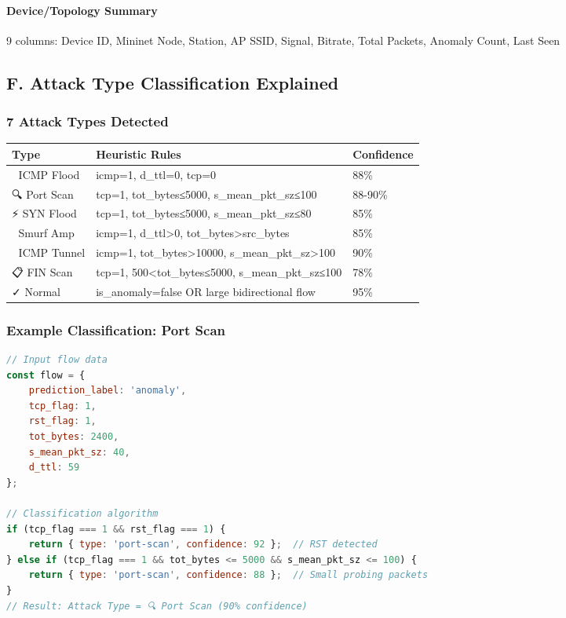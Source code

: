 \documentclass[12pt,a4paper]{article}
\begin{document}
\paragraph{Device/Topology Summary}
9 columns: Device ID, Mininet Node, Station, AP SSID, Signal, Bitrate, Total Packets, Anomaly Count, Last Seen

\subsection{F. Attack Type Classification Explained}

\subsubsection{7 Attack Types Detected}

\begin{table}[h]
\centering
\begin{tabularx}{\textwidth}{|l|X|l|}
\hline
\textbf{Type} & \textbf{Heuristic Rules} & \textbf{Confidence} \\
\hline
🌊 ICMP Flood & icmp=1, d\_ttl=0, tcp=0 & 88\% \\
\hline
🔍 Port Scan & tcp=1, tot\_bytes≤5000, s\_mean\_pkt\_sz≤100 & 88-90\% \\
\hline
⚡ SYN Flood & tcp=1, tot\_bytes≤5000, s\_mean\_pkt\_sz≤80 & 85\% \\
\hline
🔴 Smurf Amp & icmp=1, d\_ttl>0, tot\_bytes>src\_bytes & 85\% \\
\hline
🔐 ICMP Tunnel & icmp=1, tot\_bytes>10000, s\_mean\_pkt\_sz>100 & 90\% \\
\hline
📋 FIN Scan & tcp=1, 500<tot\_bytes≤5000, s\_mean\_pkt\_sz≤100 & 78\% \\
\hline
✓ Normal & is\_anomaly=false OR large bidirectional flow & 95\% \\
\hline
\end{tabularx}
\end{table}

\subsubsection{Example Classification: Port Scan}
\begin{lstlisting}[language=javascript]
// Input flow data
const flow = {
    prediction_label: 'anomaly',
    tcp_flag: 1,
    rst_flag: 1,
    tot_bytes: 2400,
    s_mean_pkt_sz: 40,
    d_ttl: 59
};

// Classification algorithm
if (tcp_flag === 1 && rst_flag === 1) {
    return { type: 'port-scan', confidence: 92 };  // RST detected
} else if (tcp_flag === 1 && tot_bytes <= 5000 && s_mean_pkt_sz <= 100) {
    return { type: 'port-scan', confidence: 88 };  // Small probing packets
}
// Result: Attack Type = 🔍 Port Scan (90% confidence)
\end{lstlisting}
\end{document}
